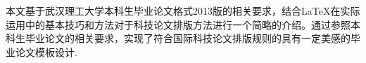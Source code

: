 
本文基于武汉理工大学本科生毕业论文格式2013版的相关要求，结合\LaTeX 在实际运用中的基本技巧和方法对于科技论文排版方法进行一个简略的介绍。通过参照本科生毕业论文的相关要求，实现了符合国际科技论文排版规则的具有一定美感的毕业论文模板设计.



